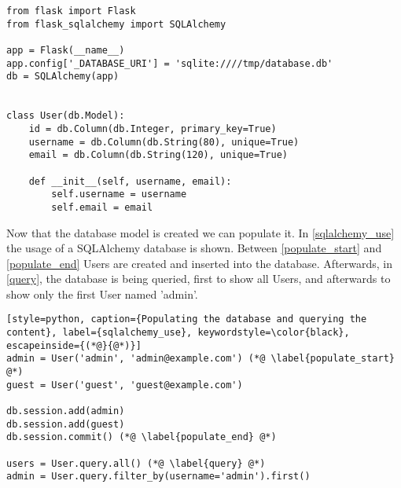 \begin{lstlisting}[style=python, caption={A SQLAlchemy database model}, label={sqlalchemy_model}]
from flask import Flask
from flask_sqlalchemy import SQLAlchemy

app = Flask(__name__)
app.config['_DATABASE_URI'] = 'sqlite:////tmp/database.db'
db = SQLAlchemy(app)


class User(db.Model): 
    id = db.Column(db.Integer, primary_key=True)
    username = db.Column(db.String(80), unique=True)
    email = db.Column(db.String(120), unique=True)

    def __init__(self, username, email):
        self.username = username
        self.email = email
\end{lstlisting}

Now that the database model is created we can populate it.
In \cref{sqlalchemy_use} the usage of a SQLAlchemy database is shown.
Between \cref{populate_start} and \cref{populate_end} Users are created and inserted into the database.
Afterwards, in \cref{query}, the database is being queried, first to show all Users, and afterwards to show only the first User named 'admin'.

\begin{lstlisting}[style=python, caption={Populating the database and querying the content}, label={sqlalchemy_use}, keywordstyle=\color{black}, escapeinside={(*@}{@*)}]
admin = User('admin', 'admin@example.com') (*@ \label{populate_start} @*)
guest = User('guest', 'guest@example.com')

db.session.add(admin)
db.session.add(guest)
db.session.commit() (*@ \label{populate_end} @*)

users = User.query.all() (*@ \label{query} @*)
admin = User.query.filter_by(username='admin').first()
\end{lstlisting}

